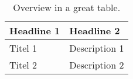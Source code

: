 
\label{appendix:table}
\begin{table}[H]
\centering
\begin{tabular}{|l|p{9cm}|}
\hline
\textbf{Headline 1} & \textbf{Headline 2} \\
\hline
Titel 1 & Description 1 \\
\hline
Titel 2 & Description 2 \\
\hline
\end{tabular}
\caption{Overview in a great table.}
\end{table}